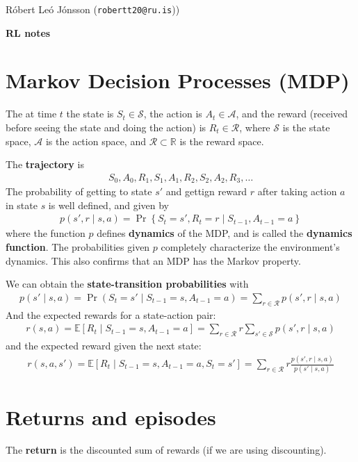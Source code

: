 \documentclass[a4paper,11pt,reqno]{amsart}
\newcounter{prob_counter}
\newcommand{\rubrik}[1]{\bigskip \begin{center}{\bf #1}\end{center} \medskip}
\begin{document}
\pagestyle{empty}
\thispagestyle{empty}

{\small{\sc\noindent
        Róbert Leó Jónsson ({\tt robertt20@ru.is}))
}}

\rubrik{RL notes}

\section*{Markov Decision Processes (MDP)}
The at time $t$ the state is $S_t \in \mathcal{S}$, the action is $A_t \in \mathcal{A}$, and the reward (received before seeing the state and doing the action) is $R_t \in \mathcal{R}$, where $\mathcal{S}$ is the state space, $\mathcal{A}$ is the action space, and $\mathcal{R} \subset \mathbb{R}$ is the reward space.

The \textbf{trajectory} is 
\begin{align}
S_0, A_0, R_1, S_1, A_1, R_2, S_2, A_2, R_3, \ldots
\end{align}
The probability of getting to state $s'$ and gettign reward $r$ after taking action $a$ in state $s$ is well defined, and given by
\begin{align}
p(s', r \mid s, a) = \operatorname{Pr} \left\{ S_t = s', R_t = r \mid S_{t - 1}, A_{t - 1} = a \right\} 
\end{align}
where the function $p$ defines \textbf{dynamics} of the MDP, and is called the \textbf{dynamics function}. The probabilities given $p$ completely characterize the environment's dynamics. This also confirms that an MDP has the Markov property. 

We can obtain the \textbf{state-transition probabilities} with
\begin{align}
p(s' \mid s, a) = \operatorname{Pr} (S_t = s' \mid S_{t - 1} = s, A_{t - 1} = a) = \sum_{r \in \mathcal{R}} p(s', r \mid s, a)
\end{align}
And the expected rewards for a state-action pair:
\begin{align}
r(s, a) = \mathbb{E}\left[ R_t \mid S_{t - 1} = s, A_{t - 1} =a\right]  = \sum_{r \in \mathcal{R}}r \sum_{s' \in \mathcal{S}} p(s', r \mid s, a)
\end{align}
and the expected reward given the next state:
\begin{align}
r(s, a, s') = \mathbb{E}\left[ R_t \mid S_{t - 1} = s, A_{t -1 } = a, S_t = s' \right] = \sum_{r \in \mathcal{R}} r \frac{p(s', r \mid s, a)}{p(s' \mid s, a)}
\end{align}

\section*{Returns and episodes}
The \textbf{return} is the discounted sum of rewards (if we are using discounting).
\end{document}
